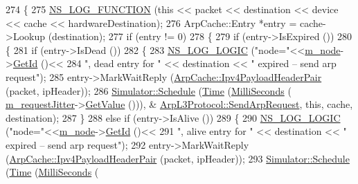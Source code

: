 \begin{DoxyCode}
274 \{
275   \hyperlink{log-macros-disabled_8h_a90b90d5bad1f39cb1b64923ea94c0761}{NS\_LOG\_FUNCTION} (\textcolor{keyword}{this} << packet << destination << device << cache << hardwareDestination);
276   ArpCache::Entry *entry = cache->Lookup (destination);
277   \textcolor{keywordflow}{if} (entry != 0)
278     \{
279       \textcolor{keywordflow}{if} (entry->IsExpired ()) 
280         \{
281           \textcolor{keywordflow}{if} (entry->IsDead ()) 
282             \{
283               \hyperlink{group__logging_ga88acd260151caf2db9c0fc84997f45ce}{NS\_LOG\_LOGIC} (\textcolor{stringliteral}{"node="}<<\hyperlink{classns3_1_1ArpL3Protocol_aa1a2d173cfb3fd7e2f8eff8504a114da}{m\_node}->\hyperlink{classns3_1_1Node_aaf49b64a843565ce3812326313b370ac}{GetId} ()<<
284                             \textcolor{stringliteral}{", dead entry for "} << destination << \textcolor{stringliteral}{" expired -- send arp request"});
285               entry->MarkWaitReply (\hyperlink{classns3_1_1ArpCache_ad018741a53ccc6cdb8b05fdd4873ef3d}{ArpCache::Ipv4PayloadHeaderPair} (packet,
       ipHeader));
286               \hyperlink{classns3_1_1Simulator_a671882c894a08af4a5e91181bf1eec13}{Simulator::Schedule} (\hyperlink{namespacens3_1_1TracedValueCallback_a7ffd3e7c142ffe7c8a1d2db9b8de38ec}{Time} (\hyperlink{group__timecivil_gaf26127cf4571146b83a92ee18679c7a9}{MilliSeconds} (
      \hyperlink{classns3_1_1ArpL3Protocol_a0d5144a236473eb6d7153600fdd7c5ee}{m\_requestJitter}->\hyperlink{classns3_1_1RandomVariableStream_a4fa5944dc4cb11544e661ed23072b36c}{GetValue} ())), &
      \hyperlink{classns3_1_1ArpL3Protocol_a9fe6faf0f82536ba2c14d5bdbf7469db}{ArpL3Protocol::SendArpRequest}, \textcolor{keyword}{this}, cache, destination);
287             \} 
288           \textcolor{keywordflow}{else} \textcolor{keywordflow}{if} (entry->IsAlive ()) 
289             \{
290               \hyperlink{group__logging_ga88acd260151caf2db9c0fc84997f45ce}{NS\_LOG\_LOGIC} (\textcolor{stringliteral}{"node="}<<\hyperlink{classns3_1_1ArpL3Protocol_aa1a2d173cfb3fd7e2f8eff8504a114da}{m\_node}->\hyperlink{classns3_1_1Node_aaf49b64a843565ce3812326313b370ac}{GetId} ()<<
291                             \textcolor{stringliteral}{", alive entry for "} << destination << \textcolor{stringliteral}{" expired -- send arp request"});
292               entry->MarkWaitReply (\hyperlink{classns3_1_1ArpCache_ad018741a53ccc6cdb8b05fdd4873ef3d}{ArpCache::Ipv4PayloadHeaderPair} (packet,
       ipHeader));
293               \hyperlink{classns3_1_1Simulator_a671882c894a08af4a5e91181bf1eec13}{Simulator::Schedule} (\hyperlink{namespacens3_1_1TracedValueCallback_a7ffd3e7c142ffe7c8a1d2db9b8de38ec}{Time} (\hyperlink{group__timecivil_gaf26127cf4571146b83a92ee18679c7a9}{MilliSeconds} (

\end{DoxyCode}
